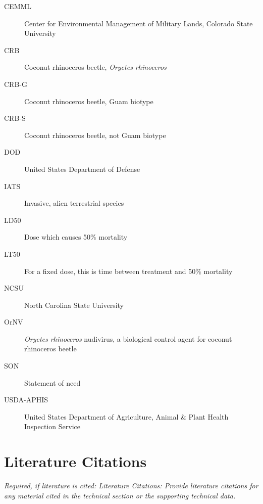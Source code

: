 \documentclass[11pt,english,letterpaper]{scrartcl}
\begin{document}
\begin{description}
	\item[CEMML] Center for Environmental Management of Military Lands, Colorado State University
	\item[CRB] Coconut rhinoceros beetle, \textit{Oryctes rhinoceros}
	\item[CRB-G] Coconut rhinoceros beetle, Guam biotype
	\item[CRB-S] Coconut rhinoceros beetle, not Guam biotype
	\item[DOD] United States Department of Defense
	\item[IATS] Invasive, alien terrestrial species
	\item[LD50] Dose which causes 50\% mortality
	\item[LT50] For a fixed dose, this is time between treatment and 50\% mortality
	\item[NCSU] North Carolina State University
	\item[OrNV] \textit{Oryctes rhinoceros} nudivirus, a biological control agent for coconut rhinoceros beetle
	\item[SON] Statement of need
	\item[USDA-APHIS] United States Department of Agriculture, Animal \& Plant Health Inspection Service
\end{description}

\clearpage

\section{Literature Citations}

\textit{Required, if literature is cited: Literature Citations: Provide literature citations for any material cited in the technical section or the supporting technical data.} \\
\end{document}
